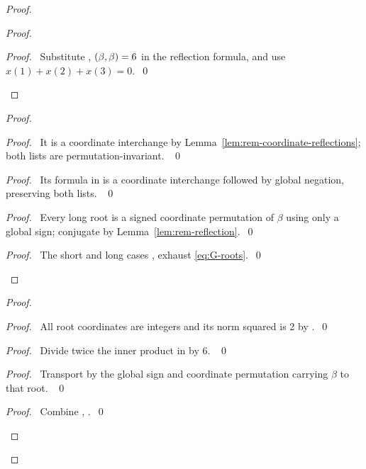 \begin{proof}
\begin{proof}
\qedstep
\begin{proof}\pf\ Substitute , $(\beta,\beta)=6$ in the
reflection formula, and use $x(1)+x(2)+x(3)=0$.~\qed\end{proof}
\end{proof}
\begin{proof}
\begin{proof}\pf\ It is a coordinate interchange by
Lemma~\ref{lem:rem-coordinate-reflections}; both lists are permutation-invariant. ~\qed\end{proof}
\begin{proof}\pf\ Its formula in  is a
coordinate interchange followed by global negation, preserving both lists. ~\qed\end{proof}
\begin{proof}\pf\ Every long root is a signed coordinate permutation
of $\beta$ using only a global sign; conjugate 
by Lemma~\ref{lem:rem-reflection}.~\qed\end{proof}
\qedstep
\begin{proof}\pf\ The short and long cases ,
 exhaust \eqref{eq:G-roots}.~\qed\end{proof}
\end{proof}
\begin{proof}
\begin{proof}\pf\ All root coordinates are integers and its norm squared
is 2 by .~\qed\end{proof}
\begin{proof}\pf\ Divide twice the inner product in
 by 6. ~\qed\end{proof}
\begin{proof}\pf\ Transport  by the global sign
and coordinate permutation carrying $\beta$ to that root. ~\qed\end{proof}
\qedstep
\begin{proof}\pf\ Combine , .~\qed\end{proof}

\end{proof}
\end{proof}
